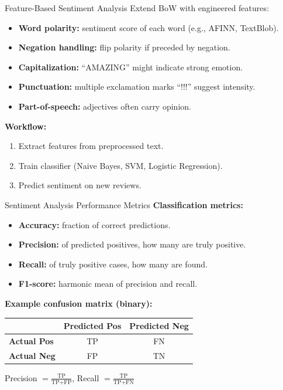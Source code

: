\documentclass[10pt]{beamer}
\begin{document}
\begin{frame}{Feature-Based Sentiment Analysis}
    Extend BoW with engineered features:
    \begin{itemize}
        \item \textbf{Word polarity:} sentiment score of each word (e.g., AFINN, TextBlob).
        \item \textbf{Negation handling:} flip polarity if preceded by negation.
        \item \textbf{Capitalization:} ``AMAZING'' might indicate strong emotion.
        \item \textbf{Punctuation:} multiple exclamation marks ``!!!'' suggest intensity.
        \item \textbf{Part-of-speech:} adjectives often carry opinion.
    \end{itemize}

    \vspace{0.2cm}
    \textbf{Workflow:}
    \begin{enumerate}
        \item Extract features from preprocessed text.
        \item Train classifier (Naive Bayes, SVM, Logistic Regression).
        \item Predict sentiment on new reviews.
    \end{enumerate}
\end{frame}

\begin{frame}{Sentiment Analysis Performance Metrics}
    \textbf{Classification metrics:}
    \begin{itemize}
        \item \textbf{Accuracy:} fraction of correct predictions.
        \item \textbf{Precision:} of predicted positives, how many are truly positive.
        \item \textbf{Recall:} of truly positive cases, how many are found.
        \item \textbf{F1-score:} harmonic mean of precision and recall.
    \end{itemize}

    \vspace{0.2cm}
    \textbf{Example confusion matrix (binary):}
    \small
    \begin{tabularx}{0.8\textwidth}{l c c}
        \toprule
        & \textbf{Predicted Pos} & \textbf{Predicted Neg} \\
        \midrule
        \textbf{Actual Pos} & TP & FN \\
        \textbf{Actual Neg} & FP & TN \\
        \bottomrule
    \end{tabularx}

    \normalsize
    \vspace{0.2cm}
    Precision $= \frac{\text{TP}}{\text{TP}+\text{FP}}$, \quad Recall $= \frac{\text{TP}}{\text{TP}+\text{FN}}$
\end{frame}
\end{document}
